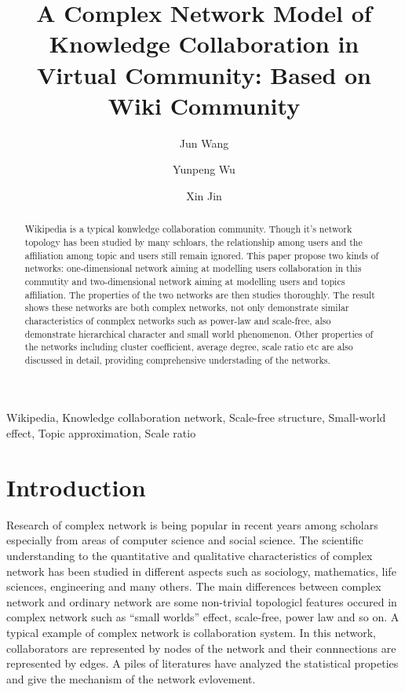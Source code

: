 \documentclass{elsarticle}
\begin{document}
\begin{frontmatter}
\title{A Complex Network Model of Knowledge Collaboration in Virtual Community: Based on Wiki Community
}
\author[buaa]{Jun Wang}

\author[buaa]{Yunpeng Wu}

\author[buaa]{Xin Jin}

\address[buaa]{School of Economics and Management, Beihang University, 
Beijing 100083, P.R. China}

\begin{abstract}
  Wikipedia is a typical konwledge collaboration community. Though
  it's network topology has been studied by many schloars, the
  relationship among users and the affiliation among topic and users 
  still remain ignored. This paper propose two kinds of networks:
one-dimensional network aiming at modelling users collaboration in
this commutity and
two-dimensional network aiming at modelling users and topics
affiliation. The properties of the two networks are then studies thoroughly. The
result shows these networks are both complex networks, not only demonstrate similar characteristics of conmplex networks such as
power-law and scale-free, also demonstrate hierarchical character  and
small world phenomenon. Other properties of the networks including
cluster coefficient, average degree, scale ratio etc are also discussed
in detail, providing comprehensive understading of the networks.

\end{abstract}

\begin{keyword}
Wikipedia, Knowledge collaboration network, Scale-free structure,
Small-world effect, Topic approximation, Scale ratio
  
\end{keyword}
\end{frontmatter}

\section{Introduction}
\label{sec:introduction}

Research of complex network is being popular in recent years among scholars
especially from areas of computer science and social science.
 The scientific understanding to the quantitative and
qualitative characteristics of complex network has been studied in
different aspects such as sociology, mathematics, life sciences,
engineering and many others. The main differences between complex
network and ordinary network are  some non-trivial
topologicl features occured in complex network such as “small worlds” effect\cite{Watts2003}, scale-free\cite{PhysRevLett.90.058701},
power law\cite{wang2003cns} and so on. A typical example of complex network is collaboration system. In this network, collaborators are represented by nodes of the network
and their connnections are represented by edges. A piles of literatures
have analyzed the statistical propeties\cite{albert-2002-74,dorogovtsev2002en,pastorsatorras2004eas} and give the mechanism of
the network evlovement.
\end{document}
